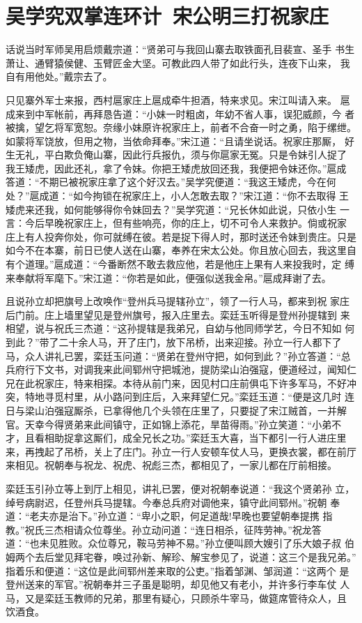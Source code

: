 \chapter{吴学究双掌连环计~宋公明三打祝家庄}

话说当时军师吴用启烦戴宗道：“贤弟可与我回山寨去取铁面孔目裴宣、圣手
书生萧让、通臂猿侯健、玉臂匠金大坚。可教此四人带了如此行头，连夜下山来，
我自有用他处。”戴宗去了。

只见寨外军士来报，西村扈家庄上扈成牵牛担酒，特来求见。宋江叫请入来。
扈成来到中军帐前，再拜恳告道：“小妹一时粗卤，年幼不省人事，误犯威颜，今
者被擒，望乞将军宽恕。奈缘小妹原许祝家庄上，前者不合奋一时之勇，陷于缧绁。
如蒙将军饶放，但用之物，当依命拜奉。”宋江道：“且请坐说话。祝家庄那厮，
好生无礼，平白欺负俺山寨，因此行兵报仇，须与你扈家无冤。只是令妹引人捉了
我王矮虎，因此还礼，拿了令妹。你把王矮虎放回还我，我便把令妹还你。”扈成
答道：“不期已被祝家庄拿了这个好汉去。”吴学究便道：“我这王矮虎，今在何
处？”扈成道：“如今拘锁在祝家庄上，小人怎敢去取？”宋江道：“你不去取得
王矮虎来还我，如何能够得你令妹回去？”吴学究道：“兄长休如此说，只依小生
一言：今后早晚祝家庄上，但有些响亮，你的庄上，切不可令人来救护。倘或祝家
庄上有人投奔你处，你可就缚在彼。若是捉下得人时，那时送还令妹到贵庄。只是
如今不在本寨，前日已使人送在山寨，奉养在宋太公处。你且放心回去，我这里自
有个道理。”扈成道：“今番断然不敢去救应他，若是他庄上果有人来投我时，定
缚来奉献将军麾下。”宋江道：“你若是如此，便强似送我金帛。”扈成拜谢了去。

且说孙立却把旗号上改唤作“登州兵马提辖孙立”，领了一行人马，都来到祝
家庄后门前。庄上墙里望见是登州旗号，报入庄里去。栾廷玉听得是登州孙提辖到
来相望，说与祝氏三杰道：“这孙提辖是我弟兄，自幼与他同师学艺，今日不知如
何到此？”带了二十余人马，开了庄门，放下吊桥，出来迎接。孙立一行人都下了
马，众人讲礼已罢，栾廷玉问道：“贤弟在登州守把，如何到此？”孙立答道：“总
兵府行下文书，对调我来此间郓州守把城池，提防梁山泊强寇，便道经过，闻知仁
兄在此祝家庄，特来相探。本待从前门来，因见村口庄前俱屯下许多军马，不好冲
突，特地寻觅村里，从小路问到庄后，入来拜望仁兄。”栾廷玉道：“便是这几时
连日与梁山泊强寇厮杀，已拿得他几个头领在庄里了，只要捉了宋江贼首，一并解
官。天幸今得贤弟来此间镇守，正如锦上添花，旱苗得雨。”孙立笑道：“小弟不
才，且看相助捉拿这厮们，成全兄长之功。”栾廷玉大喜，当下都引一行人进庄里
来，再拽起了吊桥，关上了庄门。孙立一行人安顿车仗人马，更换衣裳，都在前厅
来相见。祝朝奉与祝龙、祝虎、祝彪三杰，都相见了，一家儿都在厅前相接。

栾廷玉引孙立等上到厅上相见，讲礼已罢，便对祝朝奉说道：“我这个贤弟孙
立，绰号病尉迟，任登州兵马提辖。今奉总兵府对调他来，镇守此间郓州。”祝朝
奉道：“老夫亦是治下。”孙立道：“卑小之职，何足道哉!早晚也要望朝奉提携
指教。”祝氏三杰相请众位尊坐。孙立动问道：“连日相杀，征阵劳神。”祝龙答
道：“也未见胜败。众位尊兄，鞍马劳神不易。”孙立便叫顾大嫂引了乐大娘子叔
伯姆两个去后堂见拜宅眷，唤过孙新、解珍、解宝参见了，说道：这三个是我兄弟。”
指着乐和便道：“这位是此间郓州差来取的公吏。”指着邹渊、邹润道：“这两个
是登州送来的军官。”祝朝奉并三子虽是聪明，却见他又有老小，并许多行李车仗
人马，又是栾廷玉教师的兄弟，那里有疑心，只顾杀牛宰马，做筵席管待众人，且
饮酒食。

